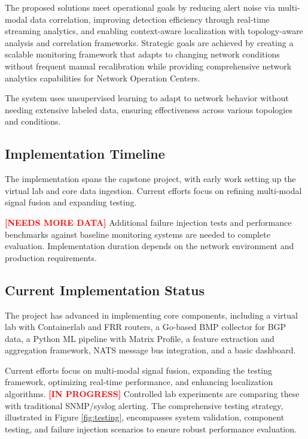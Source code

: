 \documentclass[11pt]{article}
\begin{document}
The proposed solutions meet operational goals by reducing alert noise via multi-modal data correlation, improving detection efficiency through real-time streaming analytics, and enabling context-aware localization with topology-aware analysis and correlation frameworks. Strategic goals are achieved by creating a scalable monitoring framework that adapts to changing network conditions without frequent manual recalibration while providing comprehensive network analytics capabilities for Network Operation Centers.

The system uses unsupervised learning to adapt to network behavior without needing extensive labeled data, ensuring effectiveness across various topologies and conditions.

\subsection{Implementation Timeline}

The implementation spans the capstone project, with early work setting up the virtual lab and core data ingestion. Current efforts focus on refining multi-modal signal fusion and expanding testing.

\textcolor{red}{\textbf{[NEEDS MORE DATA]}} Additional failure injection tests and performance benchmarks against baseline monitoring systems are needed to complete evaluation. Implementation duration depends on the network environment and production requirements.

\subsection{Current Implementation Status}

The project has advanced in implementing core components, including a virtual lab with Containerlab and FRR routers, a Go-based BMP collector for BGP data, a Python ML pipeline with Matrix Profile, a feature extraction and aggregation framework, NATS message bus integration, and a basic dashboard.

Current efforts focus on multi-modal signal fusion, expanding the testing framework, optimizing real-time performance, and enhancing localization algorithms. \textcolor{red}{\textbf{[IN PROGRESS]}} Controlled lab experiments are comparing these with traditional SNMP/syslog alerting. The comprehensive testing strategy, illustrated in Figure \ref{fig:testing}, encompasses system validation, component testing, and failure injection scenarios to ensure robust performance evaluation.
\end{document}
